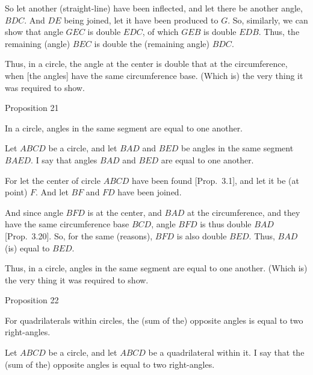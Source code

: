 \epsfysize=2.2in
\centerline{}

So let another  (straight-line)  have  been inflected, and let there be another
angle, $BDC$. And $DE$ being joined, let it have been produced to $G$.
So, similarly, we can show that angle $GEC$ is double $EDC$, of which
$GEB$ is double $EDB$. Thus, the remaining (angle) $BEC$ is double
the (remaining angle) $BDC$.

Thus, in a circle, the angle at the center is double that at the circumference, when
[the angles] have the same circumference base. (Which is) the very thing it
was required to show.


\begin{center}
{\large Proposition 21}
\end{center}

In a circle, angles in the same segment are equal to one another.

\epsfysize=2.2in
\centerline{}

Let $ABCD$ be a circle, and let $BAD$ and $BED$ be angles in the same segment
$BAED$. I say that angles $BAD$ and $BED$ are equal to one another.

For let the center of circle $ABCD$ have been found [Prop.~3.1],
and let it be (at point) $F$. And let $BF$ and $FD$ have been joined.

And since angle $BFD$ is at the center, and $BAD$ at the
circumference, and they have the same circumference base $BCD$, angle
$BFD$ is thus double $BAD$ [Prop.~3.20]. So, for the
same (reasons), $BFD$ is also double  $BED$. Thus, $BAD$ (is) equal to $BED$.

Thus, in a circle, angles in the same segment are equal to one another.
(Which is) the very thing it was required to show.


\begin{center}
{\large Proposition 22}
\end{center}

For quadrilaterals within circles, the (sum of the) opposite angles is equal to two right-angles.

\epsfysize=2.2in
\centerline{}

Let $ABCD$ be a circle, and let $ABCD$ be a quadrilateral within it. I say that
the (sum of the) opposite angles is equal to two right-angles.

